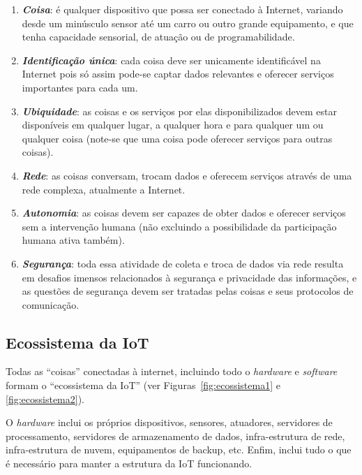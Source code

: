 \documentclass[pdftex, brazil, 12pt, twoside]{article}
\newcommand{\ingles}[1]{\textit{#1}}
\begin{document}
\begin{enumerate}
\item \emph{\textbf{Coisa}}: é qualquer dispositivo que possa ser conectado
  à Internet, variando desde um minúsculo sensor até um carro ou outro
  grande equipamento, e que tenha capacidade sensorial, de atuação ou de
  programabilidade.
\item \emph{\textbf{Identificação única}}: cada coisa deve ser unicamente
  identificável na Internet pois só assim pode-se captar dados relevantes
  e oferecer serviços importantes para cada um.
\item \emph{\textbf{Ubiquidade}}: as coisas e os serviços por elas disponibilizados
  devem estar disponíveis em qualquer lugar, a qualquer hora e para qualquer um
  ou qualquer coisa (note-se que uma coisa pode oferecer serviços para outras
  coisas).
\item \emph{\textbf{Rede}}: as coisas conversam, trocam dados e oferecem
  serviços através de uma rede complexa, atualmente a Internet.
\item \emph{\textbf{Autonomia}}: as coisas devem ser capazes de
  obter dados e oferecer serviços sem a intervenção humana (não excluindo
  a possibilidade da participação humana ativa também).
\item \emph{\textbf{Segurança}}: toda essa atividade de coleta e troca de
  dados via rede resulta em desafios imensos relacionados à segurança e
  privacidade das informações, e as questões de segurança devem ser
  tratadas pelas coisas e seus protocolos de comunicação.
\end{enumerate}


\subsection{Ecossistema da IoT}
\label{o-que-e-iot-ecossistema}

Todas as ``coisas'' conectadas à internet, incluindo todo o \ingles{hardware}
e \ingles{software} formam o ``ecossistema da IoT'' (ver Figuras~\ref{fig:ecossistema1}
e \ref{fig:ecossistema2}).

O \ingles{hardware} inclui os próprios dispositivos, sensores, atuadores,
servidores de processamento, servidores de armazenamento de dados,
infra-estrutura de rede, infra-estrutura de nuvem, equipamentos de backup, etc. Enfim,
inclui tudo o que é necessário para manter a estrutura da IoT funcionando.
\end{document}
